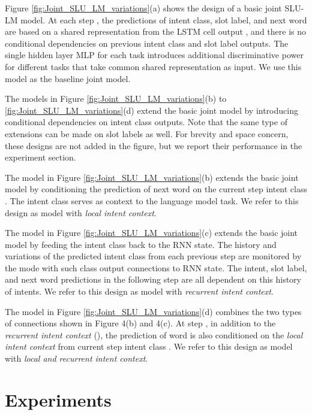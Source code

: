 \documentclass[11pt]{article}
\begin{document}
    Figure \ref{fig:Joint_SLU_LM_variations}(a) shows the design of a basic joint SLU-LM model. At each step , the predictions of intent class, slot label, and next word are based on a shared representation from the LSTM cell output , and there is no conditional dependencies on previous intent class and slot label outputs. The single hidden layer MLP for each task introduces additional discriminative power for different tasks that take common shared representation as input. We use this model as the baseline joint model.
    
    The models in Figure \ref{fig:Joint_SLU_LM_variations}(b) to \ref{fig:Joint_SLU_LM_variations}(d) extend the basic joint model by introducing conditional dependencies on intent class outputs. Note that the same type of extensions can be made on slot labels as well. For brevity and space concern, these designs are not added in the figure, but we report their performance in the experiment section.
    
    The model in Figure \ref{fig:Joint_SLU_LM_variations}(b) extends the basic joint model by conditioning the prediction of next word  on the current step intent class . The intent class serves as context to the language model task. We refer to this design as model with \textit{local intent context}.
    
    The model in Figure \ref{fig:Joint_SLU_LM_variations}(c) extends the basic joint model by feeding the intent class back to the RNN state. The history and variations of the predicted intent class from each previous step are monitored by the mode with such class output connections to RNN state. The intent, slot label, and next word predictions in the following step are all dependent on this history of intents. We refer to this design as model with \textit{recurrent intent context}.
    
    The model in Figure \ref{fig:Joint_SLU_LM_variations}(d) combines the two types of connections shown in Figure 4(b) and 4(c). At step , in addition to the \textit{recurrent intent context} (), the prediction of word  is also conditioned on the \textit{local intent context} from current step intent class . We refer to this design as model with \textit{local and recurrent intent context}.

\section{Experiments}
\end{document}
